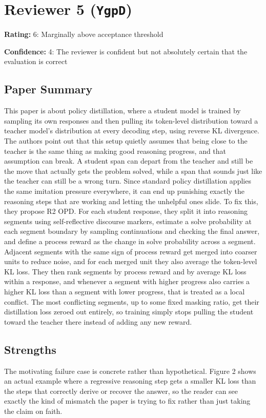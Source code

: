 \section{Reviewer 5 (\texttt{YgpD})}
\label{reviewer:5}
\noindent\textbf{Rating:} 6: Marginally above acceptance threshold\par
\noindent\textbf{Confidence:} 4: The reviewer is confident but not absolutely certain that the evaluation is correct

\subsection*{Paper Summary}
This paper is about policy distillation, where a student model is trained by sampling its own responses and then pulling its token-level distribution toward a teacher model's distribution at every decoding step, using reverse KL divergence. The authors point out that this setup quietly assumes that being close to the teacher is the same thing as making good reasoning progress, and that assumption can break. A student span can depart from the teacher and still be the move that actually gets the problem solved, while a span that sounds just like the teacher can still be a wrong turn. Since standard policy distillation applies the same imitation pressure everywhere, it can end up punishing exactly the reasoning steps that are working and letting the unhelpful ones slide. To fix this, they propose R2 OPD. For each student response, they split it into reasoning segments using self-reflective discourse markers, estimate a solve probability at each segment boundary by sampling continuations and checking the final answer, and define a process reward as the change in solve probability across a segment. Adjacent segments with the same sign of process reward get merged into coarser units to reduce noise, and for each merged unit they also average the token-level KL loss. They then rank segments by process reward and by average KL loss within a response, and whenever a segment with higher progress also carries a higher KL loss than a segment with lower progress, that is treated as a local conflict. The most conflicting segments, up to some fixed masking ratio, get their distillation loss zeroed out entirely, so training simply stops pulling the student toward the teacher there instead of adding any new reward.

\subsection*{Strengths}
The motivating failure case is concrete rather than hypothetical. Figure 2 shows an actual example where a regressive reasoning step gets a smaller KL loss than the steps that correctly derive or recover the answer, so the reader can see exactly the kind of mismatch the paper is trying to fix rather than just taking the claim on faith.

